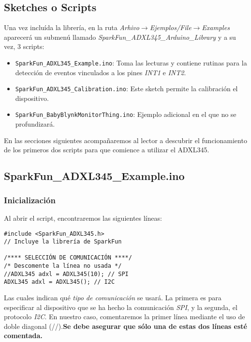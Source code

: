 \documentclass[10pt, a4paper, twocolumn]{article} %
\begin{document}
\subsection{Sketches o Scripts}

Una vez incluída la librería, en la ruta \textit{Arhivo$\rightarrow$Ejemplos/File$\rightarrow$Examples} aparecerá un submenú llamado \textit{SparkFun\_ADXL345\_Arduino\_Library} y a su vez, 3 scripts:

\begin{itemize}
\item \texttt{SparkFun\_ADXL345\_Example.ino}: Toma las lecturas y contiene rutinas para la detección de eventos vinculados a los pines \textit{INT1} e \textit{INT2}.
\item \texttt{SparkFun\_ADXL345\_Calibration.ino}: Este sketch permite la calibración el dispositivo. 
\item \texttt{SparkFun\_BabyBlynkMonitorThing.ino}: Ejemplo adicional en el que no se profundizará.
\end{itemize}

En las secciones siguientes acompañaremos al lector a descubrir el funcionamiento de los primeros dos scripts para que comience a utilizar el ADXL345.

\subsection{SparkFun\_ADXL345\_Example.ino}

\subsubsection{Inicialización}

Al abrir el script, encontraremos las siguientes líneas:

\begin{verbatim}
#include <SparkFun_ADXL345.h>
// Incluye la librería de SparkFun

/**** SELECCIÓN DE COMUNICACIÓN ****/
/* Descomente la línea no usada */
//ADXL345 adxl = ADXL345(10); // SPI 
ADXL345 adxl = ADXL345(); // I2C 
\end{verbatim}

Las cuales indican qué \textit{tipo de comunicación} se usará. La primera es para especificar al dispositivo que se ha hecho la comunicación \textit{SPI}, y la segunda, el protocolo \textit{I2C}. En nuestro caso, comentaremos la primer línea mediante el uso de doble diagonal (//).\textbf{Se debe asegurar que sólo una de estas dos líneas esté comentada.}
\end{document}
